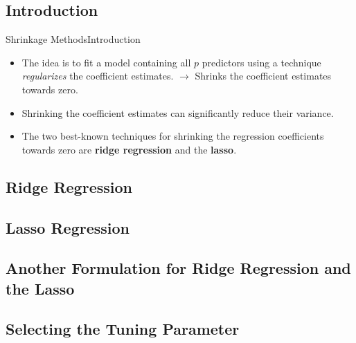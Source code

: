 \subsection{Introduction}
\begin{frame}{Shrinkage Methods}{Introduction}
    \begin{itemize}
        \item The idea is to fit a model containing all $p$ predictors using a technique \textit{regularizes} the coeﬃcient estimates. \pause 
        $\rightarrow$ Shrinks the coeﬃcient estimates towards zero. \pause 
        
        \item Shrinking the coeﬃcient estimates can significantly reduce their variance. \pause 
        
        \item  The two best-known techniques for shrinking the regression coeﬃcients towards zero are \textbf{ridge regression} and the \textbf{lasso}.

    \end{itemize}
\end{frame}

\subsection{Ridge Regression}



\subsection{Lasso Regression}


\subsection{Another Formulation for Ridge Regression and the Lasso}


\subsection{Selecting the Tuning Parameter}
